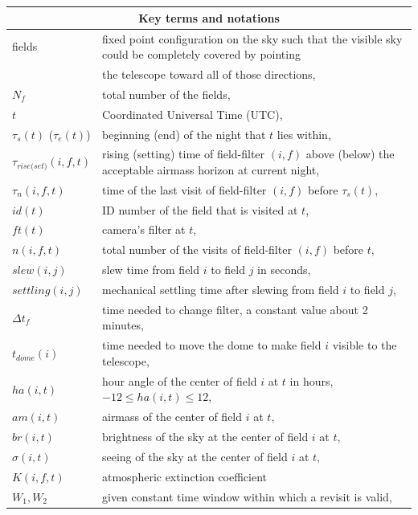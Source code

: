 \documentclass[12pt]{aastex62}
\theoremstyle{definition}
\begin{document}
\section*{}
\begin{table}[h]
\begin{tabular}{l  l }
\multicolumn{2}{c}{\textbf{Key terms and notations}}\\ \hline
fields & fixed point configuration on the sky such that the visible sky could be completely covered by pointing\\
& the telescope toward all of those directions, \\
$N_{f}$ & total number of the fields,\\
$t$& Coordinated Universal Time (UTC),\\ 
$\tau_s(t)$ ($\tau_e(t)$)& beginning (end) of the night that $t$ lies within,\\
$\tau_{rise\text{(}set\text{)}}(i,f,t)$ & rising (setting) time of field-filter $(i,f)$ above (below) the acceptable airmass horizon at current night,\\
$\tau_n(i,f,t)$& time of the last visit of field-filter $(i,f)$ before $\tau_s(t)$,\\
$id(t)$ & ID number of the field that is visited at $t$,\\
$ft(t)$& camera's filter at $t$,\\
$n(i,f,t)$ & total number of the visits of field-filter $(i,f)$ before $t$,\\
$slew(i,j)$& slew time from field $i$ to field $j$ in seconds,\\
$settling(i,j)$& mechanical settling time after slewing from field $i$ to field $j$,\\
$\Delta t_{f}$& time needed to change filter, a constant value about 2 minutes,\\
$t_{dome}(i)$& time needed to move the dome to make field $i$ visible to the telescope,\\
$ha(i,t)$ & hour angle of the center of field $i$ at $t$ in hours, $-12 \leq ha(i,t) \leq 12$,\\
$am(i,t)$ & airmass of the center of field $i$ at $t$,\\
$br(i,t)$ & brightness of the sky at the center of field $i$ at $t$,\\
$\sigma(i,t)$ & seeing of the sky at the center of field $i$ at $t$,\\
$K(i,f, t)$ & atmospheric extinction coefficient\\
$W_1, W_2$ & given constant time window within which a revisit is valid, \\
\hline
\end{tabular}
\end{table}
\newpage
\end{document}
